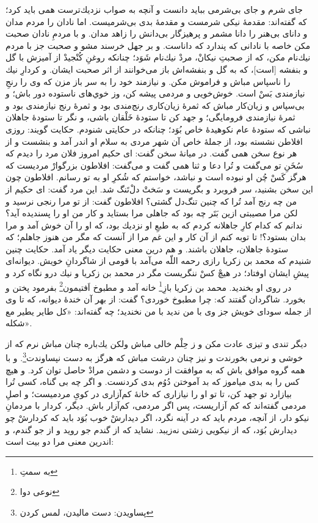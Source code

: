 جاى شرم و جاى بى‌شرمى ببايد دانست و آنچه به صواب نزديك‌ترست همى بايد كرد؛ كه گفته‌اند: مقدمۀ نيكى شرمست و مقدمۀ بدى بى‌شرميست. اما نادان را مردم مدان و داناى بى‌هنر را دانا مشمر و پرهيزگار بى‌دانش را زاهد مدان. و با مردمِ نادان صحبت مكن خاصه با نادانى كه پندارد كه داناست. و بر جهل خرسند مشو و صحبت جز با مردم نيك‌نام مكن، كه از صحبتِ نيكانْ، مردْ نيك‌نام شَوَد؛ چنانكه روغنِ كُنْجيدْ از آميزش با گل و بنفشه [است]، كه به گل و بنفشه‌اش باز مى‌خوانند از اثر صحبت ايشان. و كردارِ نيك را ناسپاس مباش و فراموش مكن. و نيازمند خود را به سر باز مزن كه وى را رنجِ نيازمندى بَسْ است. خوش‌خويى و مردمى پيشه كن، وز خوي‌هاى ناستوده دور باش؛ و بى‌سپاس و زيان‌كار مباش كه ثمرۀ زيان‌كارى رنج‌مندى بود و ثمرۀ رنج نيازمندى بود و ثمرۀ نيازمندى فرومايگى؛ و جهد كن تا ستودۀ خَلْقان باشى، و نگر تا ستودۀ جاهلان نباشى كه ستودۀ عام نكوهيدۀ خاص بُوَد؛ چنانكه در حكايتى شنودم. حكايت گويند: روزى افلاطن نشسته بود، از جملۀ خاص آن شهر مردى به سلام او اندر آمد و بنشست و از هر نوع سخن همى گفت. در ميانۀ سخن گفت: اى حكيم امروز فلان مرد را ديدم كه سُخَنِ تو مى‌گفت و تُرا دعا و ثنا همى گفت و مى‌گفت: افلاطون بزرگوارْ مرديست كه هرگز كَسْ چُن او نبوده است و نباشد، خواستم كه شُكرِ او به تو رسانم. افلاطون چون اين سخن بشنيد، سر فروبرد و بگريست و سَختْ دل‌ْتَنگ شد. اين مرد گفت: اى حكيم از من چه رنج آمد تُرا كه چنين تنگ‌دل گشتى؟ افلاطون گفت: از تو مرا رنجى نرسيد و لكن مرا مصيبتى ازين بَتَر چه بود كه جاهلى مرا بستايد و كار من او را پسنديده آيد؟ ندانم كه كدام كارِ جاهلانه كردم كه به طبعِ او نزديك بود، كه او را آن خوش آمد و مرا بدان بستود؟! تا توبه كنم از آن كار و اين غم مرا از آنست كه مگر من هنوز جاهلم؛ كه ستودۀ جاهلان، جاهلان باشند. و هم درين معنى حكايت ديگر ياد آمد. حكايت چنين شنيدم كه محمد بن زكريا رازى رحمه اللّه مى‌آمد با قومى از شاگردانِ خويش. ديوانه‌اى پيشِ ايشان اوفتاد؛ در هيچْ كسْ ننگريست مگر در محمد بن زكريا و نيك درو نگاه كرد و در روى او بخنديد. محمد بن زكريا بازِ\footnote{به سمتِ} خانه آمد و مطبوخ اَفتيمون\footnote{نوعی دوا} بفرمود پختن و بخورد. شاگردان گفتند كه: چرا مطبوخ خوردى‌؟ گفت: از بهر آن خندۀ ديوانه، كه تا وى از جمله سوداى خويش جز وى با من نديد با من نخنديد؛ چه گفته‌اند: «كل طاير يطير مع شكله».


ديگر تندى و تيزى عادت مكن و ز حِلْم خالى مباش ولكن يك‌باره چنان مباش نرم كه از خوشى و نرمى بخورندت و نيز چنان درشت مباش كه هرگز به دست نپساوندت\footnote{پساویدن: دست مالیدن، لمس کردن}. و با همه گروه موافق باش كه به موافقت از دوست و دشمن مرادْ حاصل توان كرد. و هيچ كس را به بدى مياموز كه بد آموختن دُوُم بدى كردنست. و اگر چه بى گناه، كسى تُرا بيازارد تو جهد كن، تا تو او را نيازارى كه خانۀ كم‌آزارى در كوىِ مردميست؛ و اصلِ مردمى گفته‌اند كه كم آزاريست، پس اگر مردمى، كم‌آزار باش. ديگر، كردار با مردمانِ نيكو دار، از آنچه، مردم بايد كه در آينه نگرد، اگر ديدارشْ خوب بُوَد بايد كه كردارشْ چو ديدارش بُوَد، كه از نيكويى زشتى نه‌زيبد. نشايد كه از گندم جو رويد و از جو گندم، و اندرين معنى مرا دو بيت است:

